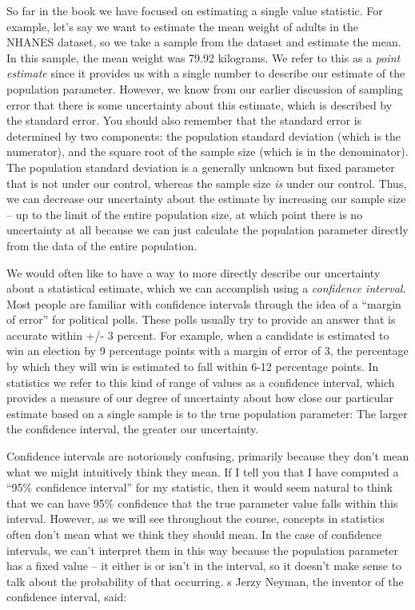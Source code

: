 \documentclass[12pt,]{book}
\theoremstyle{definition}
\theoremstyle{definition}
\theoremstyle{definition}
\theoremstyle{remark}
\begin{document}
So far in the book we have focused on estimating a single value statistic. For example, let's say we want to estimate the mean weight of adults in the NHANES dataset, so we take a sample from the dataset and estimate the mean. In this sample, the mean weight was 79.92 kilograms. We refer to this as a \emph{point estimate} since it provides us with a single number to describe our estimate of the population parameter. However, we know from our earlier discussion of sampling error that there is some uncertainty about this estimate, which is described by the standard error. You should also remember that the standard error is determined by two components: the population standard deviation (which is the numerator), and the square root of the sample size (which is in the denominator). The population standard deviation is a generally unknown but fixed parameter that is not under our control, whereas the sample size \emph{is} under our control. Thus, we can decrease our uncertainty about the estimate by increasing our sample size -- up to the limit of the entire population size, at which point there is no uncertainty at all because we can just calculate the population parameter directly from the data of the entire population.

We would often like to have a way to more directly describe our uncertainty about a statistical estimate, which we can accomplish using a \emph{confidence interval}.\\
Most people are familiar with confidence intervals through the idea of a ``margin of error'' for political polls. These polls usually try to provide an answer that is accurate within +/- 3 percent. For example, when a candidate is estimated to win an election by 9 percentage points with a margin of error of 3, the percentage by which they will win is estimated to fall within 6-12 percentage points. In statistics we refer to this kind of range of values as a confidence interval, which provides a measure of our degree of uncertainty about how close our particular estimate based on a single sample is to the true population parameter: The larger the confidence interval, the greater our uncertainty.

Confidence intervals are notoriously confusing, primarily because they don't mean what we might intuitively think they mean. If I tell you that I have computed a ``95\% confidence interval'' for my statistic, then it would seem natural to think that we can have 95\% confidence that the true parameter value falls within this interval. However, as we will see throughout the course, concepts in statistics often don't mean what we think they should mean. In the case of confidence intervals, we can't interpret them in this way because the population parameter has a fixed value -- it either is or isn't in the interval, so it doesn't make sense to talk about the probability of that occurring. s Jerzy Neyman, the inventor of the confidence interval, said:
\end{document}
